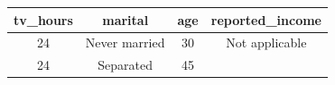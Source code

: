 \documentclass[]{tufte-book}
\newenvironment{Shaded}{}{}
\newcommand{\KeywordTok}[1]{\textcolor[rgb]{0.00,0.44,0.13}{\textbf{#1}}}
\newcommand{\DecValTok}[1]{\textcolor[rgb]{0.25,0.63,0.44}{#1}}
\newcommand{\StringTok}[1]{\textcolor[rgb]{0.25,0.44,0.63}{#1}}
\newcommand{\OperatorTok}[1]{\textcolor[rgb]{0.40,0.40,0.40}{#1}}
\newcommand{\NormalTok}[1]{#1}
\begin{document}
\begin{Shaded}
\end{Shaded}

\begin{longtable}[]{@{}cccc@{}}
\toprule
\begin{minipage}[b]{0.14\columnwidth}\centering\strut
tv\_hours\strut
\end{minipage} & \begin{minipage}[b]{0.20\columnwidth}\centering\strut
marital\strut
\end{minipage} & \begin{minipage}[b]{0.07\columnwidth}\centering\strut
age\strut
\end{minipage} & \begin{minipage}[b]{0.21\columnwidth}\centering\strut
reported\_income\strut
\end{minipage}\tabularnewline
\midrule
\endhead
\begin{minipage}[t]{0.14\columnwidth}\centering\strut
24\strut
\end{minipage} & \begin{minipage}[t]{0.20\columnwidth}\centering\strut
Never married\strut
\end{minipage} & \begin{minipage}[t]{0.07\columnwidth}\centering\strut
30\strut
\end{minipage} & \begin{minipage}[t]{0.21\columnwidth}\centering\strut
Not applicable\strut
\end{minipage}\tabularnewline
\begin{minipage}[t]{0.14\columnwidth}\centering\strut
24\strut
\end{minipage} & \begin{minipage}[t]{0.20\columnwidth}\centering\strut
Separated\strut
\end{minipage} & \begin{minipage}[t]{0.07\columnwidth}\centering\strut
45\strut
\end{minipage} & \begin{minipage}[t]{0.21\columnwidth}\centering\strut

\end{minipage}
\end{longtable}
\end{document}
